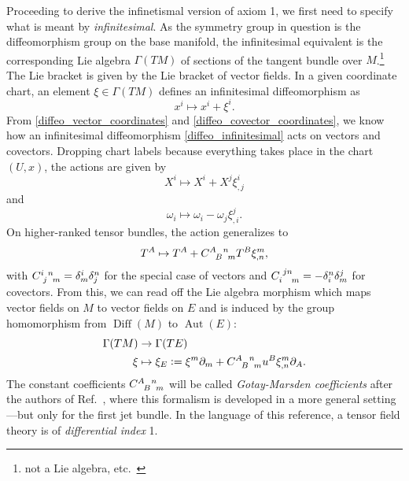 Proceeding to derive the infinetismal version of axiom 1, we first need to specify what is meant by \emph{infinitesimal}. As the symmetry group in question is the diffeomorphism group on the base manifold, the infinitesimal equivalent is the corresponding Lie algebra $\Gamma(TM)$ of sections of the tangent bundle over $M$.\footnote{not a Lie algebra, etc.~\cite{}} The Lie bracket is given by the Lie bracket of vector fields. In a given coordinate chart, an element $\xi\in\Gamma(TM)$ defines an infinitesimal diffeomorphism as
\begin{equation}\label{diffeo_infinitesimal}
  x^i \mapsto x^i + \xi^i.
\end{equation}
From \eqref{diffeo_vector_coordinates} and \eqref{diffeo_covector_coordinates}, we know how an infinitesimal diffeomorphism \eqref{diffeo_infinitesimal} acts on vectors and covectors. Dropping chart labels because everything takes place in the chart $(U,x)$, the actions are given by
\begin{equation}
  X^i \mapsto X^i + X^j \xi^i_{,j}
\end{equation}
and
\begin{equation}
  \omega_i \mapsto \omega_i - \omega_j \xi^j_{,i}.
\end{equation}
On higher-ranked tensor bundles, the action generalizes to
\begin{equation}
  T^A \mapsto T^A + C^{A\hphantom Bn}_{\hphantom AB\hphantom nm}T^B \xi^m_{,n},
\end{equation}
with $C^{i\hphantom jn}_{\hphantom ij\hphantom nm} = \delta^i_m \delta^n_j$ for the special case of vectors and $C_{i\hphantom{jn}m}^{\hphantom ijn}=-\delta^n_i\delta^j_m$ for covectors. From this, we can read off the Lie algebra morphism which maps vector fields on $M$ to vector fields on $E$ and is induced by the group homomorphism from $\operatorname{Diff}(M)$ to $\operatorname{Aut}(E)$:
\begin{equation}\label{algebra_morphism}
  \begin{aligned}
    \Gamma(TM) &{} \rightarrow \Gamma(TE) \\
    \xi &{} \mapsto \xi_E \vcentcolon= \xi^m\partial_m + C^{A\hphantom Bn}_{\hphantom AB\hphantom nm}u^B \xi^m_{,n} \partial_A.
  \end{aligned}
\end{equation}
The constant coefficients $C^{A\hphantom Bn}_{\hphantom AB\hphantom nm}$ will be called \emph{Gotay-Marsden coefficients} after the authors of Ref.~\cite{gotay-marsden1992}, where this formalism is developed in a more general setting---but only for the first jet bundle. In the language of this reference, a tensor field theory is of \emph{differential index} 1.

